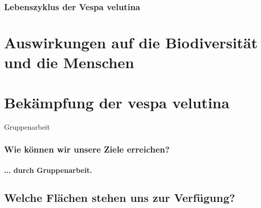 \documentclass[aspectratio=169]{beamer}
\begin{document}
\subsubsection{Lebenszyklus der Vespa velutina}
\section{Auswirkungen auf die Biodiversität und die Menschen}
\section{Bekämpfung der vespa velutina}





\begin{frame}{Gruppenarbeit}
	\frametitle{Wie können wir unsere Ziele erreichen?} 
	\framesubtitle{... durch Gruppenarbeit.}
\end{frame}
\subsection[Flächen]{Welche Flächen stehen uns zur Verfügung?}
\end{document}
